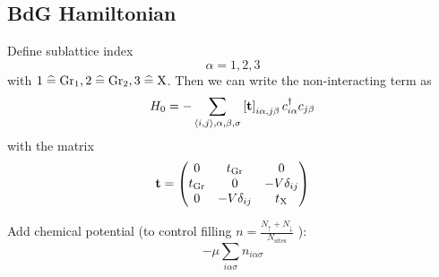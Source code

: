 \subsection{BdG Hamiltonian}

Define sublattice index
\begin{equation}
    \alpha = 1, 2, 3
\end{equation}
with \(1 \mathrel{\widehat{=}} \mathrm{Gr}_1, 2 \mathrel{\widehat{=}} \mathrm{Gr}_2, 3 \mathrel{\widehat{=}} \mathrm{X}\).
Then we can write the non-interacting term as
\begin{equation}
    H_0 = - \sum_{\langle i, j \rangle, \alpha, \beta, \sigma} \left[\textbf{t} \right]_{i\alpha,j\beta} c_{i\alpha}^{\dagger} c_{j\beta}
\end{equation}
with the matrix 
\begin{equation}
    \textbf{t} = \begin{pmatrix}
                  0 & t_{\mathrm{Gr}} & 0 \\
                  t_{\mathrm{Gr}} & 0 & -V \delta_{ij} \\
                  0 & -V \delta_{ij} & t_{\mathrm{X}} \\
    \end{pmatrix}
\end{equation}

Add chemical potential (to control filling \(n = \frac{N_{\uparrow} + N_{\downarrow}}{N_{\mathrm{sites}}}\) ):
\begin{equation}
    -\mu \sum_{i \alpha \sigma} n_{i \alpha \sigma}
\end{equation}


